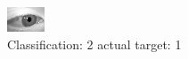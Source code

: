 \begin{figure}[h!]
\begin{center}
\includegraphics[width=0.60\columnwidth]{figures/ID2742_class_2_target_1.png}
\end{center}
\caption{ Classification: 2 actual target: 1}
\label{fig:ID2742_class_2_target_1}
\end{figure}

